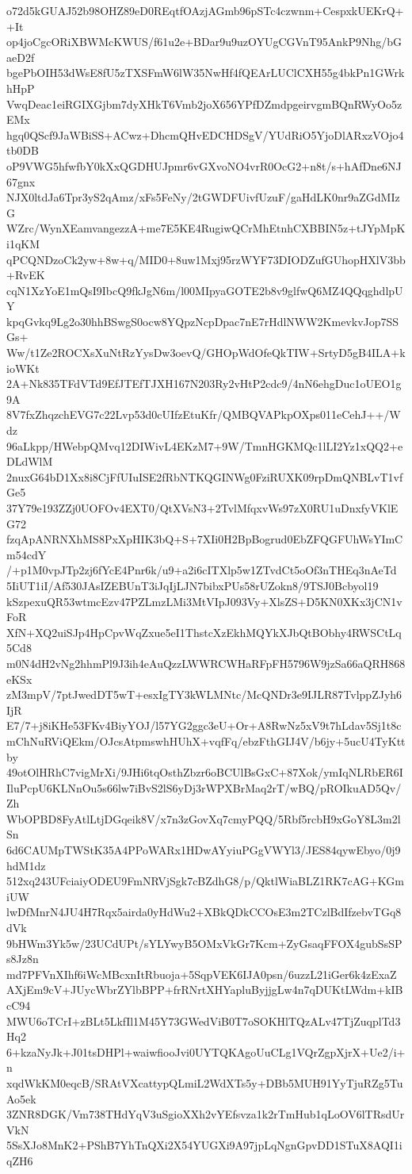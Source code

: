 o72d5kGUAJ52b98OHZ89eD0REqtfOAzjAGmb96pSTc4czwnm+CespxkUEKrQ++It
op4joCgcORiXBWMcKWUS/f61u2e+BDar9u9uzOYUgCGVnT95AnkP9Nhg/bGaeD2f
bgePbOIH53dWsE8fU5zTXSFmW6lW35NwHf4fQEArLUClCXH55g4bkPn1GWrkhHpP
VwqDeac1eiRGIXGjbm7dyXHkT6Vmb2joX656YPfDZmdpgeirvgmBQnRWyOo5zEMx
hgq0QScf9JaWBiSS+ACwz+DhcmQHvEDCHDSgV/YUdRiO5YjoDlARxzVOjo4tb0DB
oP9VWG5hfwfbY0kXxQGDHUJpmr6vGXvoNO4vrR0OcG2+n8t/s+hAfDne6NJ67gnx
NJX0ltdJa6Tpr3yS2qAmz/xFs5FeNy/2tGWDFUivfUzuF/gaHdLK0nr9aZGdMIzG
WZrc/WynXEamvangezzA+me7E5KE4RugiwQCrMhEtnhCXBBIN5z+tJYpMpKi1qKM
qPCQNDzoCk2yw+8w+q/MID0+8uw1Mxj95rzWYF73DIODZufGUhopHXlV3bb+RvEK
cqN1XzYoE1mQsI9IbcQ9fkJgN6m/l00MIpyaGOTE2b8v9glfwQ6MZ4QQqghdlpUY
kpqGvkq9Lg2o30hhBSwgS0ocw8YQpzNcpDpac7nE7rHdlNWW2KmevkvJop7SSGs+
Ww/t1Ze2ROCXsXuNtRzYysDw3oevQ/GHOpWdOfeQkTIW+SrtyD5gB4ILA+kioWKt
2A+Nk835TFdVTd9EfJTEfTJXH167N203Ry2vHtP2cdc9/4nN6ehgDuc1oUEO1g9A
8V7fxZhqzchEVG7c22Lvp53d0cUIfzEtuKfr/QMBQVAPkpOXps011eCehJ++/Wdz
96aLkpp/HWebpQMvq12DIWivL4EKzM7+9W/TmnHGKMQc1lLI2Yz1xQQ2+eDLdWlM
2nuxG64bD1Xx8i8CjFfUIuISE2fRbNTKQGINWg0FziRUXK09rpDmQNBLvT1vfGe5
37Y79e193ZZj0UOFOv4EXT0/QtXVsN3+2TvlMfqxvWs97zX0RU1uDnxfyVKlEG72
fzqApANRNXhMS8PxXpHIK3bQ+S+7XIi0H2BpBogrud0EbZFQGFUhWsYImCm54cdY
/+p1M0vpJTp2zj6fYcE4Pnr6k/u9+a2i6cITXlp5w1ZTvdCt5oOf3nTHEq3nAeTd
5IiUT1iI/Af530JAsIZEBUnT3iJqIjLJN7bibxPUs58rUZokn8/9TSJ0Bcbyol19
kSzpexuQR53wtmcEzv47PZLmzLMi3MtVIpJ093Vy+XlsZS+D5KN0XKx3jCN1vFoR
XfN+XQ2uiSJp4HpCpvWqZxue5eI1ThstcXzEkhMQYkXJbQtBObhy4RWSCtLq5Cd8
m0N4dH2vNg2hhmPl9J3ih4eAuQzzLWWRCWHaRFpFH5796W9jzSa66aQRH868eKSx
zM3mpV/7ptJwedDT5wT+esxIgTY3kWLMNtc/McQNDr3e9IJLR87TvlppZJyh6IjR
E7/7+j8iKHe53FKv4BiyYOJ/l57YG2ggc3eU+Or+A8RwNz5xV9t7hLdav5Sj1t8c
mChNuRViQEkm/OJcsAtpmswhHUhX+vqfFq/ebzFthGIJ4V/b6jy+5ucU4TyKttby
49otOlHRhC7vigMrXi/9JHi6tqOsthZbzr6oBCUlBsGxC+87Xok/ymIqNLRbER6I
IluPcpU6KLNnOu5s66lw7iBvS2lS6yDj3rWPXBrMaq2rT/wBQ/pROIkuAD5Qv/Zh
WbOPBD8FyAtlLtjDGqeik8V/x7n3zGovXq7cmyPQQ/5Rbf5rcbH9xGoY8L3m2lSn
6d6CAUMpTWStK35A4PPoWARx1HDwAYyiuPGgVWYl3/JES84qywEbyo/0j9hdM1dz
512xq243UFciaiyODEU9FmNRVjSgk7cBZdhG8/p/QktlWiaBLZ1RK7cAG+KGmiUW
lwDfMnrN4JU4H7Rqx5airda0yHdWu2+XBkQDkCCOsE3m2TCzlBdIfzebvTGq8dVk
9bHWm3Yk5w/23UCdUPt/sYLYwyB5OMxVkGr7Kcm+ZyGsaqFFOX4gubSsSPs8Jz8n
md7PFVnXIhf6iWcMBcxnItRbuoja+5SqpVEK6IJA0psn/6uzzL21iGer6k4zExaZ
AXjEm9cV+JUycWbrZYlbBPP+frRNrtXHYapluByjjgLw4n7qDUKtLWdm+kIBcC94
MWU6oTCrI+zBLt5LkfIl1M45Y73GWedViB0T7oSOKHlTQzALv47TjZuqplTd3Hq2
6+kzaNyJk+J01tsDHPl+waiwfiooJvi0UYTQKAgoUuCLg1VQrZgpXjrX+Ue2/i+n
xqdWkKM0eqcB/SRAtVXcattypQLmiL2WdXTs5y+DBb5MUH91YyTjuRZg5TuAo5ek
3ZNR8DGK/Vm738THdYqV3uSgioXXh2vYEfsvza1k2rTmHub1qLoOV6lTRsdUrVkN
5SsXJo8MnK2+PShB7YhTnQXi2X54YUGXi9A97jpLqNgnGpvDD1STuX8AQI1iqZH6
